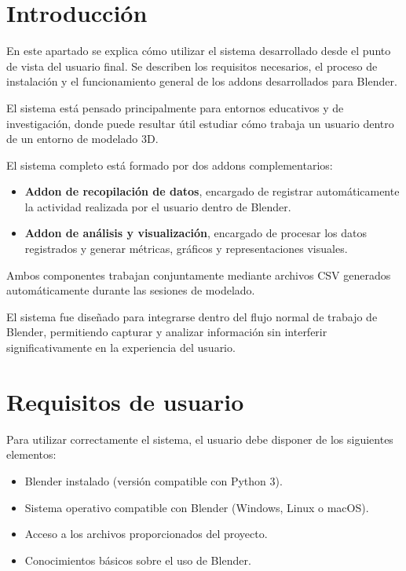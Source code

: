 
\section{Introducción}

En este apartado se explica cómo utilizar el sistema desarrollado desde el punto de vista del usuario final. Se describen los requisitos necesarios, el proceso de instalación y el funcionamiento general de los addons desarrollados para Blender.

El sistema está pensado principalmente para entornos educativos y de investigación, donde puede resultar útil estudiar cómo trabaja un usuario dentro de un entorno de modelado 3D.

El sistema completo está formado por dos addons complementarios:

\begin{itemize}
    \item \textbf{Addon de recopilación de datos}, encargado de registrar automáticamente la actividad realizada por el usuario dentro de Blender.
    
    \item \textbf{Addon de análisis y visualización}, encargado de procesar los datos registrados y generar métricas, gráficos y representaciones visuales.
\end{itemize}

Ambos componentes trabajan conjuntamente mediante archivos CSV generados automáticamente durante las sesiones de modelado.

El sistema fue diseñado para integrarse dentro del flujo normal de trabajo de Blender, permitiendo capturar y analizar información sin interferir significativamente en la experiencia del usuario.

\section{Requisitos de usuario}

Para utilizar correctamente el sistema, el usuario debe disponer de los siguientes elementos:

\begin{itemize}
    \item Blender instalado (versión compatible con Python 3).
    \item Sistema operativo compatible con Blender (Windows, Linux o macOS).
    \item Acceso a los archivos proporcionados del proyecto.
    \item Conocimientos básicos sobre el uso de Blender.
\end{itemize}


